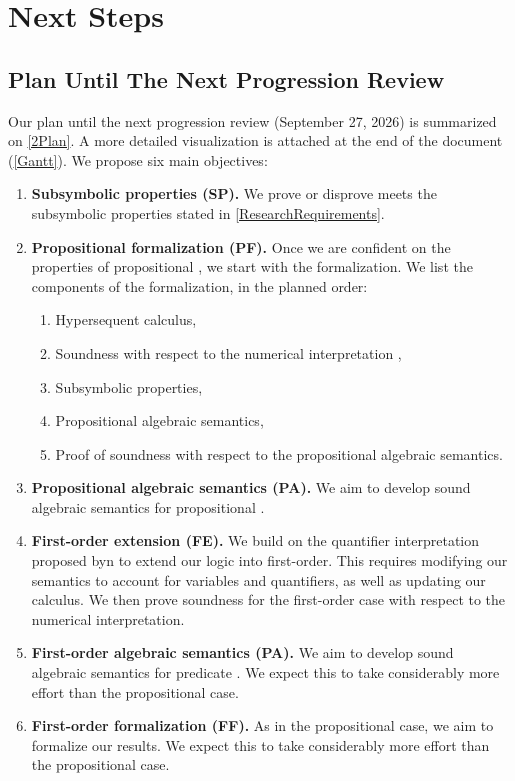 \section{Next Steps} \label{section:Next Steps}

\subsection{Plan Until The Next Progression Review}
Our plan until the next progression review (September 27, 2026) is summarized on \cref{2Plan}. A more detailed visualization is attached at the end of the document (\cref{Gantt}). We propose six main objectives: 
\begin{enumerate}
    \item \textbf{Subsymbolic properties (SP).} We prove or disprove \OL{} meets the subsymbolic properties stated in \cref{ResearchRequirements}.
    \item \textbf{Propositional formalization (PF).} Once we are confident on the properties of propositional \OL{}, we start with the formalization. We list the components of the formalization, in the planned order:
    \begin{enumerate}
        \item Hypersequent calculus,
        \item Soundness with respect to the numerical interpretation \mcita{},
        \item Subsymbolic properties,
        \item Propositional algebraic semantics,
        \item Proof of soundness with respect to the propositional algebraic semantics.
    \end{enumerate}
    \item \textbf{Propositional algebraic semantics (PA).} We aim to develop sound algebraic semantics for propositional \OL{}.
    
    \item \textbf{First-order extension (FE).} We build on the quantifier interpretation proposed byn\citeauthor{capucci2024quantifiers} to extend our logic into first-order. This requires modifying our semantics to account for variables and quantifiers, as well as updating our calculus. We then prove soundness for the first-order case with respect to the numerical interpretation.
    
    \item \textbf{First-order algebraic semantics (PA).} We aim to develop sound algebraic semantics for predicate \OL{}. We expect this to take considerably more effort than the propositional case. 
    
    \item \textbf{First-order formalization (FF).} As in the propositional case, we aim to formalize our results.  We expect this to take considerably more effort than the propositional case.
\end{enumerate}

